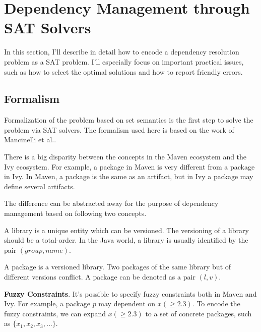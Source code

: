 \section{Dependency Management through SAT Solvers}

In this section, I'll describe in detail how to encode a dependency resolution problem as a SAT problem. I'll especially focus on important practical issues, such as how to select the optimal solutions and how to report friendly errors.

\subsection{Formalism}

Formalization of the problem based on set semantics is the first step to solve the problem via SAT solvers. The formalism used here is based on the work of Mancinelli et al.\cite{mancinelli2006managing}.

There is a big disparity between the concepts in the Maven ecosystem and the Ivy ecosystem. For example, a package in Maven is very different from a package in Ivy. In Maven, a package is the same as an artifact, but in Ivy a package may define several artifacts.

The difference can be abstracted away for the purpose of dependency management based on following two concepts.

\begin{definition}[Library]
  A library is a unique entity which can be versioned.  The versioning of a library should be a total-order. In the Java world, a library is usually identified by the pair $(group, name)$.
\end{definition}

\begin{definition}[Package]
  A package is a versioned library. Two packages of the same library but of different versions conflict.  A package can be denoted as a pair $(l, v)$.
\end{definition}


\noindent
\textbf{Fuzzy Constraints}. It's possible to specify fuzzy constraints both in Maven and Ivy. For example, a package $p$ may dependent on $x(\geq 2.3)$. To encode the fuzzy constraints, we can expand $x(\geq 2.3)$ to a set of  concrete packages, such as $\{x_1, x_2, x_3, ...\}$.

